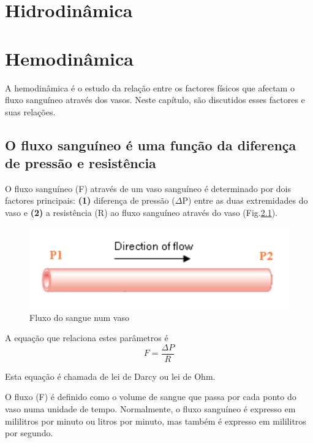 \documentclass[
  portuguese,
  ]{book}
\begin{document}
\hypertarget{hidrodinuxe2mica}{%
\chapter{Hidrodinâmica}\label{hidrodinuxe2mica}}

\hypertarget{hemodinuxe2mica}{%
\chapter{Hemodinâmica}\label{hemodinuxe2mica}}

A hemodinâmica é o estudo da relação entre os factores físicos que afectam o fluxo sanguíneo através dos vasos. Neste capítulo, são discutidos esses factores e suas relações.

\hypertarget{o-fluxo-sanguuxedneo-uxe9-uma-funuxe7uxe3o-da-diferenuxe7a-de-pressuxe3o-e-resistuxeancia}{%
\section{O fluxo sanguíneo é uma função da diferença de pressão e resistência}\label{o-fluxo-sanguuxedneo-uxe9-uma-funuxe7uxe3o-da-diferenuxe7a-de-pressuxe3o-e-resistuxeancia}}

O fluxo sanguíneo (F) através de um vaso sanguíneo é determinado por dois factores principais: \textbf{(1)} diferença de pressão (\(\Delta\)P) entre as duas extremidades do vaso e \textbf{(2)} a resistência (R) ao fluxo sanguíneo através do vaso (Fig.\ref{fig:imghemo1}).

\begin{figure}

{\centering \includegraphics[width=0.5\linewidth]{img/hemo_1} 

}

\caption{Fluxo do sangue num vaso}\label{fig:imghemo1}
\end{figure}

A equação que relaciona estes parâmetros é
\begin{equation}
F=\frac{\Delta P}{R}
\label{eq:darcy}
\end{equation}

Esta equação é chamada de lei de Darcy ou lei de Ohm.

O fluxo (F) é definido como o volume de sangue que passa por cada ponto do vaso numa unidade de tempo. Normalmente, o fluxo sanguíneo é expresso em mililitros por minuto ou litros por minuto, mas também é expresso em mililitros por segundo.
\end{document}
